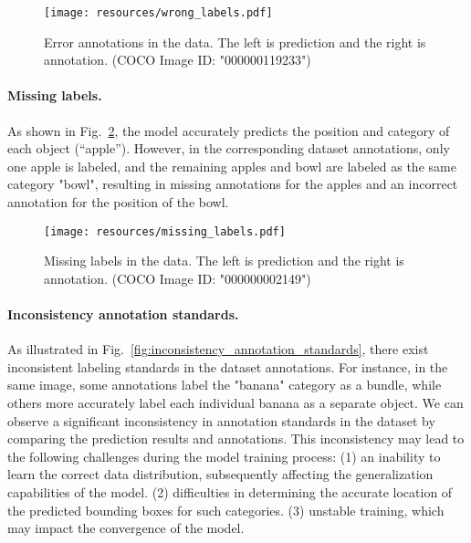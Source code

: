 \documentclass{article}
\begin{document}
\begin{figure}[h]
    \centering
\texttt{[image: resources/wrong\_labels.pdf]}
\caption{Error annotations in the data. The left is prediction and the right is annotation. (COCO Image ID: "000000119233")
    }
    \label{fig:wrong_labels}
\end{figure} 
\paragraph{Missing labels.} As shown in Fig.~\ref{fig:missing_labels}, the model accurately predicts the position and category of each object (``apple''). However, in the corresponding dataset annotations, only one apple is labeled, and the remaining apples and bowl are labeled as the same category "bowl", resulting in missing annotations for the apples and an incorrect annotation for the position of the bowl.

\begin{figure}[h]
    \centering
\texttt{[image: resources/missing\_labels.pdf]}
\caption{Missing labels in the data. The left is prediction and the right is annotation. (COCO Image ID: "000000002149")
    }
    \label{fig:missing_labels}
\end{figure} 
\paragraph{Inconsistency annotation standards.} As illustrated in Fig.~\ref{fig:inconsistency_annotation_standards}, there exist inconsistent labeling standards in the dataset annotations. For instance, in the same image, some annotations label the "banana" category as a bundle, while others more accurately label each individual banana as a separate object. We can observe a significant inconsistency in annotation standards in the dataset by comparing the prediction results and annotations. This inconsistency may lead to the following challenges during the model training process: (1) an inability to learn the correct data distribution, subsequently affecting the generalization capabilities of the model. (2) difficulties in determining the accurate location of the  predicted bounding boxes for such categories. (3) unstable training, which may impact the convergence of the model.
\end{document}
